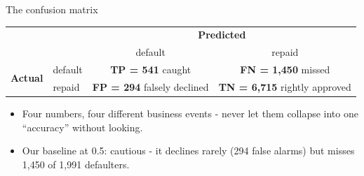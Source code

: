 \documentclass[10pt,aspectratio=169]{beamer}
\begin{document}
\begin{frame}{The confusion matrix}
  \begin{center}
  \small
  \begin{tabular}{@{}ll|cc@{}}
    \toprule
    & & \multicolumn{2}{c}{\textbf{Predicted}} \\
    & & default & repaid \\
    \midrule
    \multirow{2}{*}{\textbf{Actual}}
    & default & \textbf{TP = 541} \; caught & \alert{\textbf{FN = 1{,}450}} \; missed \\
    & repaid  & \alert{\textbf{FP = 294}} \; falsely declined & \textbf{TN = 6{,}715} \; rightly approved \\
    \bottomrule
  \end{tabular}
  \end{center}
  \vspace{0.5em}
  \begin{itemize}\small
    \item Four numbers, four different business events - \alert{never} let
          them collapse into one ``accuracy'' without looking.
    \item Our baseline at 0.5: cautious - it declines rarely (294 false
          alarms) but \alert{misses 1{,}450 of 1{,}991 defaulters}.
  \end{itemize}
\end{frame}
\end{document}
